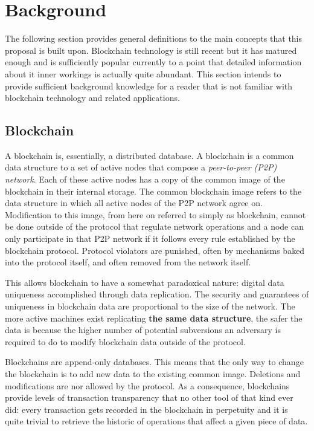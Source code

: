 \documentclass[../main.tex]{subfiles}
\begin{document}
\section{Background}
\label{sec:background}
The following section provides general definitions to the  main concepts that this proposal is built upon. Blockchain technology is still recent but it has matured enough and is sufficiently popular currently to a point that detailed information about it inner workings is actually quite abundant. This section intends to provide sufficient background knowledge for a reader that is not familiar with blockchain technology and related applications.

\subsection{Blockchain}
A blockchain is, essentially, a distributed database. A blockchain is a common data structure to a set of active nodes that compose a \textit{peer-to-peer (P2P) network}. Each of these active nodes has a copy of the common image of the blockchain in their internal storage. The common blockchain image refers to the data structure in which all active nodes of the P2P network agree on. Modification to this image, from here on referred to simply as blockchain, cannot be done outside of the protocol that regulate network operations and a node can only participate in that P2P network if it follows every rule established by the blockchain protocol. Protocol violators are punished, often by mechanisms baked into the protocol itself, and often removed from the network itself.
\par
This allows blockchain to have a somewhat paradoxical nature: digital data uniqueness accomplished through data replication. The security and guarantees of uniqueness in blockchain data are proportional to the size of the network. The more active machines exist replicating \textbf{the same data structure}, the safer the data is because the higher number of potential subversions an adversary is required to do to modify blockchain data outside of the protocol.
\par
Blockchains are append-only databases. This means that the only way to change the blockchain is to add new data to the existing common image. Deletions and modifications are nor allowed by the protocol. As a consequence, blockchains provide levels of transaction transparency that no other tool of that kind ever did: every transaction gets recorded in the blockchain in perpetuity and it is quite trivial to retrieve the historic of operations that affect a given piece of data.
\end{document}
